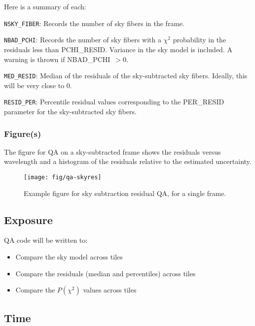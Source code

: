 \documentclass[12pt]{article}
\newenvironment{myitemize}
{ \begin{itemize}
    \setlength{\itemsep}{0pt}
    \setlength{\parskip}{0pt}
    \setlength{\parsep}{0pt}     }
{ \end{itemize}                  }
\begin{document}
\noindent
Here is a summary of each:

\vskip 0.2in

\noindent
{\tt NSKY\_FIBER}:  Records the number of sky fibers in the frame.

\noindent
{\tt NBAD\_PCHI}:  Records the number of sky fibers with a 
$\chi^2$ probability in the residuals less than PCHI\_RESID.  
Variance in the sky model is included.
A warning is thrown if NBAD\_PCHI~$>0$.

\noindent
{\tt MED\_RESID}:  Median of the residuals of the sky-subtracted
sky fibers.  Ideally, this will be very close to 0.

\noindent
{\tt RESID\_PER}:  Percentile residual values corresponding to the
PER\_RESID parameter for the sky-subtracted sky fibers.

\subsubsection{Figure(s)}

The figure for QA on a sky-subtracted frame shows the
residuals versus wavelength and a histogram of 
the residuals relative to the estimated uncertainty. 

\begin{figure}[htb]
\begin{center}
\texttt{[image: fig/qa-skyres]}
\caption{Example figure for sky subtraction 
residual QA, for a single frame.
}
\label{fig:skysub_frame}
\end{center}
\end{figure}


\subsection{Exposure}

QA code will be written to:

\begin{myitemize}
\item Compare the sky model across tiles 
\item Compare the residuals (median and percentiles) across tiles
\item Compare the $P(\chi^2)$ values across tiles
\end{myitemize}

\subsection{Time}
\end{document}
